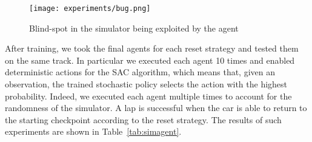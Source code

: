 
\begin{figure}[h]
  \begin{center}
    \texttt{[image: experiments/bug.png]}
  \end{center}
  \caption{Blind-spot in the simulator being exploited by the agent}
  \label{fig:bug}
\end{figure}

After training, we took the final agents for each reset strategy and tested them on the same track. In particular we executed each agent 10 times and enabled deterministic actions for the SAC algorithm, which means that, given an observation, the trained stochastic policy selects the action with the highest probability. Indeed, we executed each agent multiple times to account for the randomness of the simulator. A lap is successful when the car is able to return to the starting checkpoint according to the reset strategy. The results of such experiments are shown in Table~\ref{tab:simagent}.

